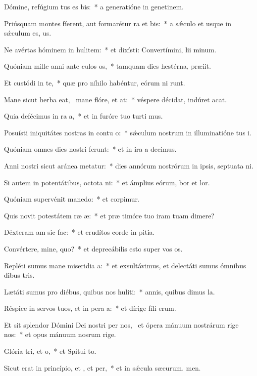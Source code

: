 \item Dómine, refúgium tus es bis:~* a generatióne in genetinem.
\item Priúsquam montes fíerent, aut formarétur ra et bis:~* a sǽculo et usque in sǽculum  es, us.
\item Ne avértas hóminem in hulitem:~* et dixísti: Convertímini, lii minum.
\item Quóniam mille anni ante culos os,~* tamquam dies hestérna,  præiit.
\item Et custódi in te,~* quæ pro níhilo habéntur, eórum ni runt.
\item Mane sicut herba eat,~\pscross{} mane flóre, et at:~* véspere décidat, indúret  acat.
\item Quia defécimus in ra a,~* et in furóre tuo turti mus.
\item Posuísti iniquitátes nostras in contu o:~* sǽculum nostrum in illuminatióne tus i.
\item Quóniam omnes dies nostri ferunt:~* et in ira a decimus.
\item Anni nostri sicut aránea metatur:~* dies annórum nostrórum in ipsis, septuata ni.
\item Si autem in potentátibus, octota ni:~* et ámplius eórum, bor et lor.
\item Quóniam supervénit manedo:~* et corpimur.
\item Quis novit potestátem ræ æ:~* et præ timóre tuo iram tuam dimere?
\item Déxteram am sic  fac:~* et erudítos corde in pitia.
\item Convértere, mine, quo?~* et deprecábilis esto super vos os.
\item Repléti sumus mane miseridia a:~* et exsultávimus, et delectáti sumus ómnibus dibus tris.
\item Lætáti sumus pro diébus, quibus nos huliti:~* annis, quibus dimus la.
\item Réspice in servos tuos, et in pera a:~* et dírige fíli erum.
\item Et sit splendor Dómini Dei nostri per nos,~\pscross{} et ópera mánuum nostrárum rige  nos:~* et opus mánuum nosrum rige.
\item Glória tri, et o,~* et Spitui to.
\item Sicut erat in princípio, et , et per,~* et in sǽcula sæcurum. men.
